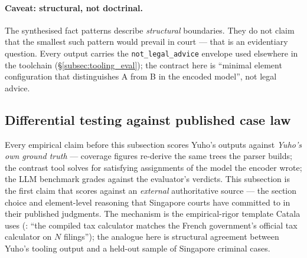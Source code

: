 \paragraph{Caveat: structural, not doctrinal.} The synthesised
fact patterns describe \emph{structural} boundaries. They do not
claim that the smallest such pattern would prevail in court ---
that is an evidentiary question. Every output carries the
\texttt{not\_legal\_advice} envelope used elsewhere in the
toolchain (\S\ref{subsec:tooling_eval}); the contract here is
``minimal element configuration that distinguishes A from B in
the encoded model'', not legal advice.

\subsection{Differential testing against published case law}
\label{subsec:case_law_diff}

Every empirical claim before this subsection scores Yuho's outputs
against \emph{Yuho's own ground truth} --- coverage figures
re-derive the same trees the parser builds; the contrast tool
solves for satisfying assignments of the model the encoder wrote;
the LLM benchmark grades against the evaluator's verdicts. This
subsection is the first claim that scores against an
\emph{external} authoritative source --- the section choice and
element-level reasoning that Singapore courts have committed to
in their published judgments. The mechanism is the
empirical-rigor template Catala uses
(\cite{catala2021}: ``the compiled tax calculator matches the
French government's official tax calculator on $N$ filings'');
the analogue here is structural agreement between Yuho's tooling
output and a held-out sample of Singapore criminal cases.

